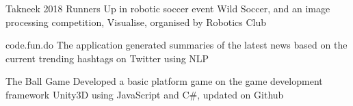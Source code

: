 
\begin{cvmiscs}

  \cvmisc
    {Takneek 2018}
    {Runners Up in robotic soccer event Wild Soccer, and an image processing competition, Visualise, organised by Robotics Club}
  
  \cvmisc
    {code.fun.do}
    {The application generated summaries of the latest news based on the current trending hashtags on Twitter using NLP}

  \cvmisc
    {The Ball Game}
    {Developed a basic platform game on the game development framework Unity3D using JavaScript and C\#, updated on Github}

\end{cvmiscs}